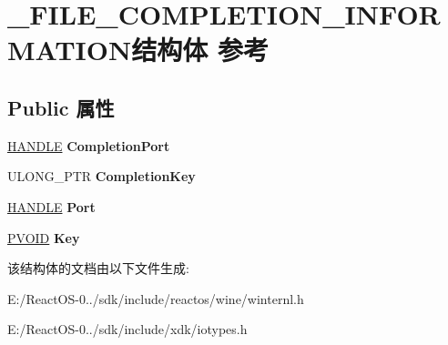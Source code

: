 \hypertarget{struct___f_i_l_e___c_o_m_p_l_e_t_i_o_n___i_n_f_o_r_m_a_t_i_o_n}{}\section{\+\_\+\+F\+I\+L\+E\+\_\+\+C\+O\+M\+P\+L\+E\+T\+I\+O\+N\+\_\+\+I\+N\+F\+O\+R\+M\+A\+T\+I\+O\+N结构体 参考}
\label{struct___f_i_l_e___c_o_m_p_l_e_t_i_o_n___i_n_f_o_r_m_a_t_i_o_n}
\subsection*{Public 属性}
\begin{DoxyCompactItemize}
\item 
\mbox{\label{struct___f_i_l_e___c_o_m_p_l_e_t_i_o_n___i_n_f_o_r_m_a_t_i_o_n_ab6f95307ea77001f0ce12447482dadbc}} 
\hyperlink{interfacevoid}{H\+A\+N\+D\+LE} {\bfseries Completion\+Port}
\item 
\mbox{\label{struct___f_i_l_e___c_o_m_p_l_e_t_i_o_n___i_n_f_o_r_m_a_t_i_o_n_a5986d25cc1a50ce5807c8aadb81b2fa6}} 
U\+L\+O\+N\+G\+\_\+\+P\+TR {\bfseries Completion\+Key}
\item 
\mbox{\label{struct___f_i_l_e___c_o_m_p_l_e_t_i_o_n___i_n_f_o_r_m_a_t_i_o_n_a9b2b38b58dc3d9d72203f1ddef5cb347}} 
\hyperlink{interfacevoid}{H\+A\+N\+D\+LE} {\bfseries Port}
\item 
\mbox{\label{struct___f_i_l_e___c_o_m_p_l_e_t_i_o_n___i_n_f_o_r_m_a_t_i_o_n_a0923952bd744067c417a1779e46b17eb}} 
\hyperlink{interfacevoid}{P\+V\+O\+ID} {\bfseries Key}
\end{DoxyCompactItemize}


该结构体的文档由以下文件生成\+:\begin{DoxyCompactItemize}
\item 
E\+:/\+React\+O\+S-\/0../sdk/include/reactos/wine/winternl.\+h\item 
E\+:/\+React\+O\+S-\/0../sdk/include/xdk/iotypes.\+h\end{DoxyCompactItemize}
